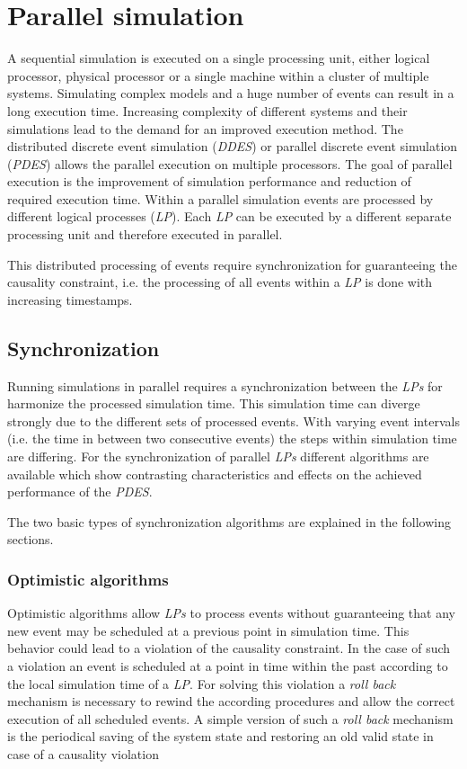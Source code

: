 \chapter{Parallel simulation}
\label{cha:parallel_sim}
A sequential simulation is executed on a single processing unit, either logical processor, physical processor or a single machine within a cluster of multiple systems.
Simulating complex models and a huge number of events can result in a long execution time.
Increasing complexity of different systems and their simulations lead to the demand for an improved execution method.
The distributed discrete event simulation (\emph{DDES}) or parallel discrete event simulation (\emph{PDES}) allows the parallel execution on multiple processors.
The goal of parallel execution is the improvement of simulation performance and reduction of required execution time.
Within a parallel simulation events are processed by different logical processes (\emph{LP}).
Each \emph{LP} can be executed by a different separate processing unit and therefore executed in parallel. \cite{bagrodia_parsec:_1998}

This distributed processing of events require synchronization for guaranteeing the causality constraint, i.e. the processing of all events within a \emph{LP} is done with increasing timestamps.

\section{Synchronization}
\label{sec:parallel_synchronization}
Running simulations in parallel requires a synchronization between the \emph{LPs} for harmonize the processed simulation time.
This simulation time can diverge strongly due to the different sets of processed events.
With varying event intervals (i.e. the time in between two consecutive events) the steps within simulation time are differing.
For the synchronization of parallel \emph{LPs} different algorithms are available which show contrasting characteristics and effects on the achieved performance of the \emph{PDES}. \cite[chapter 2]{bagrodia_performance_2000}

The two basic types of synchronization algorithms are explained in the following sections.

\subsection{Optimistic algorithms}
\label{sec:parallel_synchronization_optimistic}
Optimistic algorithms allow \emph{LPs} to process events without guaranteeing that any new event may be scheduled at a previous point in simulation time.
This behavior could lead to a violation of the causality constraint.
In the case of such a violation an event is scheduled at a point in time within the past according to the local simulation time of a \emph{LP}.
For solving this violation a \emph{roll back} mechanism is necessary to rewind the according procedures and allow the correct execution of all scheduled events.
A simple version of such a \emph{roll back} mechanism is the periodical saving of the system state and restoring an old valid state in case of a causality violation \cite{bagrodia_parsec:_1998}
    
